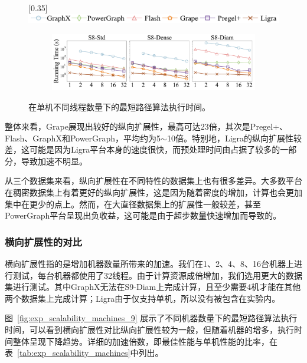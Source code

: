 \begin{figure}[h]\centering

	\scalebox{0.35}[0.35]{\includegraphics{figures/vertical_scalability_legend.pdf}}

	\begin{subfigure}[b]{0.8\textwidth}
        \includegraphics[width=\textwidth]{figures/sssp_vertical_scalability.pdf}
    \end{subfigure}
	
	\caption{在单机不同线程数量下的最短路径算法执行时间。}
	\label{fig:exp_scalability_threads}
\end{figure}

整体来看，Grape展现出较好的纵向扩展性，最高可达23倍，其次是Pregel+、Flash、GraphX和PowerGraph，平均约为5$\sim$10倍。特别地，Ligra的纵向扩展性较差，这可能是因为Ligra平台本身的速度很快，而预处理时间由占据了较多的一部分，导致加速不明显。

从三个数据集来看，纵向扩展性在不同特性的数据集上也有很多差异。大多数平台在稠密数据集上有着更好的纵向扩展性，这是因为随着密度的增加，计算也会更加集中在更少的点上。然而，在大直径数据集上的扩展性一般较差，甚至PowerGraph平台呈现出负收益，这可能是由于超步数量快速增加而导致的。


\subsubsection{横向扩展性的对比}

横向扩展性指的是增加机器数量所带来的加速。我们在1、2、4、8、16台机器上进行测试，每台机器都使用了32线程。由于计算资源成倍增加，我们选用更大的数据集进行测试。其中GraphX无法在S9-Diam上完成计算，且至少需要4机才能在其他两个数据集上完成计算；Ligra由于仅支持单机，所以没有被包含在实验内。

图~\ref{fig:exp_scalability_machines_9} 展示了不同机器数量下的最短路径算法执行时间，可以看到横向扩展性对比纵向扩展性较为一般，但随着机器的增多，执行时间整体呈现下降趋势。详细的加速倍数，即最佳性能与单机性能的比率，在表~\ref{tab:exp_scalability_machines}中列出。

